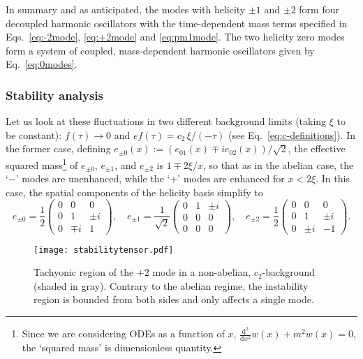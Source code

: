 In summary and as anticipated, the modes with helicity $\pm 1$ and $\pm2$ form four decoupled harmonic oscillators with the time-dependent mass terms specified in Eqs.~\eqref{eq:-2mode}, \eqref{eq:+2mode} and \eqref{eq:pm1mode}. The two helicity zero modes form  a system of coupled, mass-dependent harmonic oscillators given by Eq.~\eqref{eq:0modes}.



 \subsubsection*{Stability analysis}
 Let us look at these fluctuations in two different background limits (taking $\xi$ to be constant): $f(\tau) \rightarrow 0$ and $e f(\tau) = c_2 \,  \xi/(- \tau)$ (see Eq.~\eqref{eq:c-definitions}). In the former case, defining $e_{\pm0}(x):=(e_{01}(x)\mp ie_{02}(x))/\sqrt{2}$, the effective squared mass\footnote{Since we are considering ODEs as a function of $x$, $\tfrac{\textrm{d}^2}{\textrm{d}x^2} w(x) + m^2 w(x) = 0$, the `squared mass' is dimensionless quantity.} of $e_{\pm0}$, $e_{\pm1}$, and $e_{\pm2}$ is $1\mp2\xi/x$, so that as in the abelian case, the `$-$' modes are
unenhanced, while the `$+$' modes are enhanced for $x<2\xi$. In this case, the spatial components of the helicity basis simplify to
\begin{equation}
e_{\pm0}=\frac{1}{2}\left(\begin{array}{ccc}
0 & 0 & 0\\
0 & 1 & \pm i\\
0 & \mp i & 1
\end{array}\right),\quad e_{\pm1}=\frac{1}{\sqrt{2}}\left(\begin{array}{ccc}
0 & 1 & \pm i\\
0 & 0 & 0\\
0 & 0 & 0
\end{array}\right),\quad e_{\pm2}=\frac{1}{2}\left(\begin{array}{ccc}
0 & 0 & 0\\
0 & 1 & \pm i\\
0 & \pm i & -1
\end{array}\right).
\end{equation}

 \begin{figure}
 \centering
  \texttt{[image: stabilitytensor.pdf]}
  \caption{Tachyonic region of the $+2$ mode in a non-abelian, $c_2$-background (shaded in gray). Contrary to the abelian regime, the instability region is bounded from both sides and only affects a single mode. }
  \label{fig:stabilitytensor}
 \end{figure}

